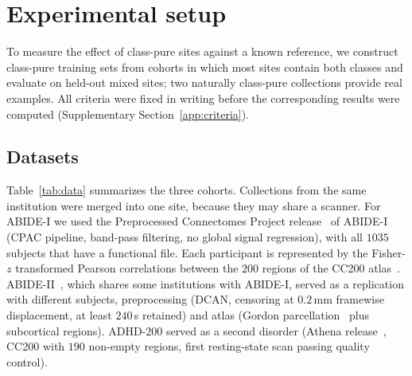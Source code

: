 \section{Experimental setup}\label{sec:setup}

To measure the effect of class-pure sites against a known reference, we construct class-pure training sets from cohorts in which most sites contain both classes and evaluate on held-out mixed sites; two naturally class-pure collections provide real examples. All criteria were fixed in writing before the corresponding results were computed (Supplementary Section~\ref{app:criteria}).

\subsection{Datasets}\label{sec:data}

Table~\ref{tab:data} summarizes the three cohorts. Collections from the same institution were merged into one site, because they may share a scanner. For ABIDE-I we used the Preprocessed Connectomes Project release~\cite{craddock2013pcp} of ABIDE-I~\cite{dimartino2014} (CPAC pipeline, band-pass filtering, no global signal regression), with all $1035$ subjects that have a functional file. Each participant is represented by the Fisher-$z$ transformed Pearson correlations between the $200$ regions of the CC200 atlas~\cite{craddock2012}. ABIDE-II~\cite{dimartino2017}, which shares some institutions with ABIDE-I, served as a replication with different subjects, preprocessing (DCAN, censoring at $0.2$\,mm framewise displacement, at least $240$\,s retained) and atlas (Gordon parcellation~\cite{gordon2016} plus subcortical regions). ADHD-200 served as a second disorder (Athena release~\cite{bellec2017}, CC200 with $190$ non-empty regions, first resting-state scan passing quality control).


